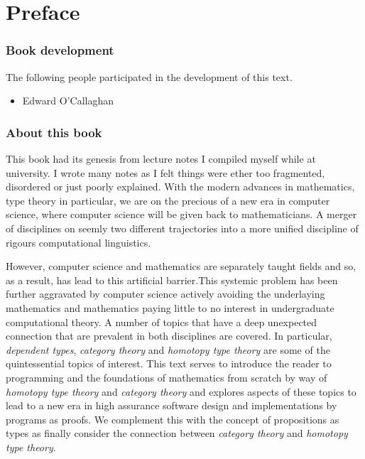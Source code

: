 %
%

\chapter*{Preface}
\label{cha:preface}


\subsection*{Book development}
The following people participated in the development of this text.

\begin{multicols}{2}{
\begin{itemize}
\item[] Edward O'Callaghan
\end{itemize}
}
\end{multicols}


\subsection*{About this book}


This book had its genesis from lecture notes I compiled myself while at
university. I wrote many notes as I felt things were ether too fragmented,
disordered or just poorly explained. With the modern advances in mathematics,
type theory in particular, we are on the precious of a new era in computer
science, where computer science will be given back to mathematicians. A merger
of disciplines on seemly two different trajectories into a more unified
discipline of rigours computational linguistics.

However, computer science and mathematics are separately taught fields and so,
as a result, has lead to this artificial barrier.This systemic problem has
been further aggravated by computer science actively avoiding the underlaying
mathematics and mathematics paying little to no interest in undergraduate
computational theory. A number of topics that have a deep unexpected connection
that are prevalent in both disciplines are covered. In particular,
\emph{dependent types}, \emph{category theory} and \emph{homotopy type theory}
are some of the quintessential topics of interest. This text serves to
introduce the reader to programming and the foundations of mathematics from
scratch by way of \emph{homotopy type theory} and \emph{category theory} and
explores aspects of these topics to lead to a new era in high assurance
software design and implementations by programs as proofs. We complement this
with the concept of propositions as types as finally consider the connection
between \emph{category theory} and \emph{homotopy type theory}.

